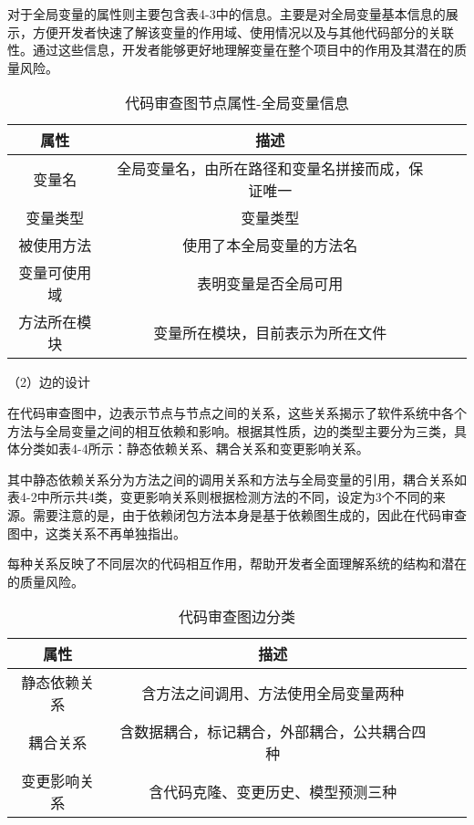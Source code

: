 对于全局变量的属性则主要包含表4-3中的信息。主要是对全局变量基本信息的展示，方便开发者快速了解该变量的作用域、使用情况以及与其他代码部分的关联性。通过这些信息，开发者能够更好地理解变量在整个项目中的作用及其潜在的质量风险。

\begin{table}[htbp]
\caption{代码审查图节点属性-全局变量信息}
\vspace{0.5em}\centering\wuhao
\begin{tabular}{cccc}
\toprule
    属性 & 描述 \\
\midrule
变量名 & 全局变量名，由所在路径和变量名拼接而成，保证唯一  \\
变量类型 & 变量类型   \\
被使用方法 & 使用了本全局变量的方法名   \\
变量可使用域 & 表明变量是否全局可用   \\
方法所在模块 &  变量所在模块，目前表示为所在文件  \\  
\bottomrule
\end{tabular}
\end{table}


（2）边的设计

在代码审查图中，边表示节点与节点之间的关系，这些关系揭示了软件系统中各个方法与全局变量之间的相互依赖和影响。根据其性质，边的类型主要分为三类，具体分类如表4-4所示：静态依赖关系、耦合关系和变更影响关系。

其中静态依赖关系分为方法之间的调用关系和方法与全局变量的引用，耦合关系如表4-2中所示共4类，变更影响关系则根据检测方法的不同，设定为3个不同的来源。需要注意的是，由于依赖闭包方法本身是基于依赖图生成的，因此在代码审查图中，这类关系不再单独指出。

每种关系反映了不同层次的代码相互作用，帮助开发者全面理解系统的结构和潜在的质量风险。

\begin{table}[htbp]
\caption{代码审查图边分类}
\vspace{0.5em}\centering\wuhao
\begin{tabular}{cccc}
\toprule
属性 & 描述 \\
\midrule
静态依赖关系 & 含方法之间调用、方法使用全局变量两种  \\
耦合关系 & 含数据耦合，标记耦合，外部耦合，公共耦合四种   \\
变更影响关系 & 含代码克隆、变更历史、模型预测三种  \\
\bottomrule
\end{tabular}
\end{table}



